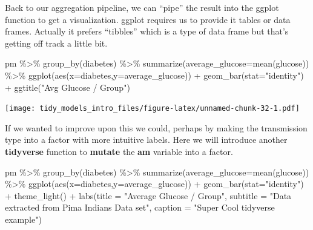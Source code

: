 \documentclass[
]{article}
\newenvironment{Shaded}{\begin{snugshade}}{\end{snugshade}}
\newcommand{\AttributeTok}[1]{\textcolor[rgb]{0.77,0.63,0.00}{#1}}
\newcommand{\FunctionTok}[1]{\textcolor[rgb]{0.00,0.00,0.00}{#1}}
\newcommand{\NormalTok}[1]{#1}
\newcommand{\SpecialCharTok}[1]{\textcolor[rgb]{0.00,0.00,0.00}{#1}}
\newcommand{\StringTok}[1]{\textcolor[rgb]{0.31,0.60,0.02}{#1}}
\begin{document}
Back to our aggregation pipeline, we can ``pipe'' the result into the
ggplot function to get a visualization. ggplot requires us to provide it
tables or data frames. Actually it prefers ``tibbles'' which is a type
of data frame but that's getting off track a little bit.

\begin{Shaded}
\begin{Highlighting}[]
\NormalTok{pm }\SpecialCharTok{\%\textgreater{}\%} 
  \FunctionTok{group\_by}\NormalTok{(diabetes) }\SpecialCharTok{\%\textgreater{}\%} 
  \FunctionTok{summarize}\NormalTok{(}\AttributeTok{average\_glucose=}\FunctionTok{mean}\NormalTok{(glucose)) }\SpecialCharTok{\%\textgreater{}\%}
  \FunctionTok{ggplot}\NormalTok{(}\FunctionTok{aes}\NormalTok{(}\AttributeTok{x=}\NormalTok{diabetes,}\AttributeTok{y=}\NormalTok{average\_glucose)) }\SpecialCharTok{+} 
    \FunctionTok{geom\_bar}\NormalTok{(}\AttributeTok{stat=}\StringTok{"identity"}\NormalTok{)  }\SpecialCharTok{+} 
    \FunctionTok{ggtitle}\NormalTok{(}\StringTok{"Avg Glucose / Group"}\NormalTok{)}
\end{Highlighting}
\end{Shaded}

\texttt{[image: tidy\_models\_intro\_files/figure-latex/unnamed-chunk-32-1.pdf]}

If we wanted to improve upon this we could, perhaps by making the
transmission type into a factor with more intuitive labels. Here we will
introduce another \textbf{tidyverse} function to \textbf{mutate} the
\textbf{am} variable into a factor.

\begin{Shaded}
\begin{Highlighting}[]
\NormalTok{pm }\SpecialCharTok{\%\textgreater{}\%} 
  \FunctionTok{group\_by}\NormalTok{(diabetes) }\SpecialCharTok{\%\textgreater{}\%} 
  \FunctionTok{summarize}\NormalTok{(}\AttributeTok{average\_glucose=}\FunctionTok{mean}\NormalTok{(glucose)) }\SpecialCharTok{\%\textgreater{}\%}
  \FunctionTok{ggplot}\NormalTok{(}\FunctionTok{aes}\NormalTok{(}\AttributeTok{x=}\NormalTok{diabetes,}\AttributeTok{y=}\NormalTok{average\_glucose)) }\SpecialCharTok{+} 
    \FunctionTok{geom\_bar}\NormalTok{(}\AttributeTok{stat=}\StringTok{"identity"}\NormalTok{)  }\SpecialCharTok{+} 
    \FunctionTok{theme\_light}\NormalTok{() }\SpecialCharTok{+} 
    \FunctionTok{labs}\NormalTok{(}\AttributeTok{title =} \StringTok{"Average Glucose / Group"}\NormalTok{, }
         \AttributeTok{subtitle =} \StringTok{"Data extracted from Pima Indians Data set"}\NormalTok{, }
         \AttributeTok{caption =} \StringTok{"Super Cool tidyverse example"}\NormalTok{)}
\end{Highlighting}
\end{Shaded}
\end{document}
